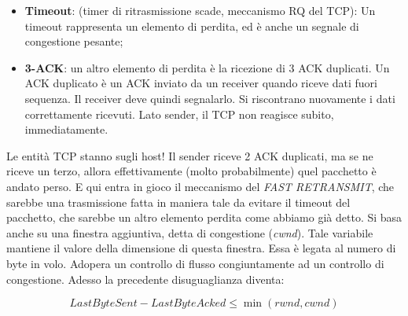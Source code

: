 \begin{itemize}
\item{\textbf{Timeout}}: (timer di ritrasmissione scade, meccanismo RQ del TCP): Un timeout rappresenta un elemento di perdita, ed è anche un segnale di congestione pesante;
\item{\textbf{3-ACK}}: un altro elemento di perdita è la ricezione di 3 ACK duplicati. Un ACK duplicato è un ACK inviato da un receiver quando riceve dati fuori sequenza. Il receiver deve quindi segnalarlo. Si riscontrano nuovamente i dati correttamente ricevuti. Lato sender, il TCP non reagisce subito, immediatamente.
\end{itemize}

Le entità TCP stanno sugli host! Il sender riceve 2 ACK duplicati, ma se ne riceve un terzo, allora effettivamente (molto probabilmente) quel pacchetto è andato perso. E qui entra in gioco il meccanismo del \textit{FAST RETRANSMIT}, che sarebbe una trasmissione fatta in maniera tale da evitare il timeout del pacchetto, che sarebbe un altro elemento perdita come abbiamo già detto. 
Si basa anche su una finestra aggiuntiva, detta di congestione (\textit{cwnd}). Tale variabile mantiene il valore della dimensione di questa finestra. Essa è legata al numero di byte in volo. Adopera un controllo di flusso congiuntamente ad un controllo di congestione. Adesso la precedente disuguaglianza diventa:

\[
	LastByteSent - LastByteAcked \leq \min(rwnd,cwnd)
\]

